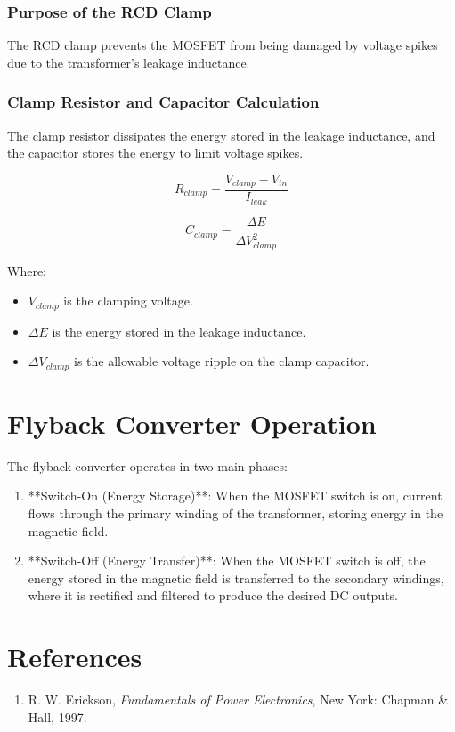\documentclass{article}
\begin{document}
\subsubsection{Purpose of the RCD Clamp}
The RCD clamp prevents the MOSFET from being damaged by voltage spikes due to the transformer's leakage inductance.

\subsubsection{Clamp Resistor and Capacitor Calculation}
The clamp resistor dissipates the energy stored in the leakage inductance, and the capacitor stores the energy to limit voltage spikes.

\[
R_{clamp} = \frac{V_{clamp} - V_{in}}{I_{leak}}
\]

\[
C_{clamp} = \frac{\Delta E}{\Delta V_{clamp}^2}
\]

Where:
\begin{itemize}
    \item $V_{clamp}$ is the clamping voltage.
    \item $\Delta E$ is the energy stored in the leakage inductance.
    \item $\Delta V_{clamp}$ is the allowable voltage ripple on the clamp capacitor.
\end{itemize}

\section{Flyback Converter Operation}
The flyback converter operates in two main phases:
\begin{enumerate}
    \item **Switch-On (Energy Storage)**: When the MOSFET switch is on, current flows through the primary winding of the transformer, storing energy in the magnetic field.
    \item **Switch-Off (Energy Transfer)**: When the MOSFET switch is off, the energy stored in the magnetic field is transferred to the secondary windings, where it is rectified and filtered to produce the desired DC outputs.
\end{enumerate}

\section{References}

\begin{enumerate}
    \item R. W. Erickson, \textit{Fundamentals of Power Electronics}, New York: Chapman \& Hall, 1997.
   
\end{enumerate}
\end{document}
